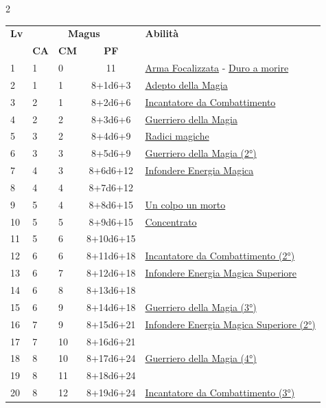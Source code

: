 {\begin{multicols}{2}



\noindent\begin{tabularx}{\linewidth}{p{0.55cm}|p{0.55cm}p{0.55cm}c|X|}
	\toprule
 \rowcolor{gray!20}	\textbf{Lv} & \multicolumn{3}{c|}{\textbf{Magus}} & \textbf{Abilità} \\
& \centering\arraybackslash \textbf{CA} & \centering\arraybackslash \textbf{CM} & \centering\arraybackslash \textbf{PF} & \\
	\toprule
	1 & 1 & 0 & 11 & \hyperlink{Arma Focalizzata}{Arma Focalizzata} - \hyperlink{Duro a morire}{Duro a morire}\\
	\rowcolor{gray!20}2 & 1 & 1 & 8+1d6+3 & \hyperlink{Adepto della Magia}{Adepto della Magia}\\
	3 & 2 & 1 & 8+2d6+6 & \hyperlink{Incantatore da Combattimento}{Incantatore da Combattimento}\\
	\rowcolor{gray!20}4 & 2 & 2 & 8+3d6+6 & \hyperlink{Guerriero della Magia}{Guerriero della Magia}\\
	5 & 3 & 2 & 8+4d6+9 & \hyperlink{Radici magiche}{Radici magiche}\\
	\rowcolor{gray!20}6 & 3 & 3 & 8+5d6+9 & \hyperlink{Guerriero della Magia}{Guerriero della Magia (2°)}\\
	7 & 4 & 3 & 8+6d6+12 & \hyperlink{Infondere Energia Magica}{Infondere Energia Magica}\\
	\rowcolor{gray!20}8 & 4 & 4 & 8+7d6+12 & \\
	9 & 5 & 4 & 8+8d6+15 & \hyperlink{Un colpo un morto}{Un colpo un morto}\\
	\rowcolor{gray!20}10 & 5 & 5 & 8+9d6+15 & \hyperlink{Concentrato}{Concentrato}\\
	11 & 5 & 6 & 8+10d6+15 & \\
	\rowcolor{gray!20}12 & 6 & 6 & 8+11d6+18 & \hyperlink{Incantatore da Combattimento}{Incantatore da Combattimento (2°)}\\
	13 & 6 & 7 & 8+12d6+18 & \hyperlink{Infondere Energia Magica Superiore}{Infondere Energia Magica Superiore}\\
	\rowcolor{gray!20}14 & 6 & 8 & 8+13d6+18 & \\
	15 & 6 & 9 & 8+14d6+18 & \hyperlink{Guerriero della Magia}{Guerriero della Magia (3°)}\\
	\rowcolor{gray!20}16 & 7 & 9 & 8+15d6+21 & \hyperlink{Infondere Energia Magica Superiore}{Infondere Energia Magica Superiore (2°)}\\
	17 & 7 & 10 & 8+16d6+21 & \\
	\rowcolor{gray!20}18 & 8 & 10 & 8+17d6+24 & \hyperlink{Guerriero della Magia}{Guerriero della Magia (4°)}\\
	19 & 8 & 11 & 8+18d6+24 & \\
	\rowcolor{gray!20}20 & 8 & 12 & 8+19d6+24 & \hyperlink{Incantatore da Combattimento}{Incantatore da Combattimento (3°)}\\
\end{tabularx}



\end{multicols}}
